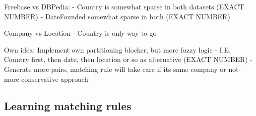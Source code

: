 Freebase vs DBPedia:
- Country is somewhat sparse in both datasets (EXACT NUMBER)
- DateFounded somewhat sparse in both (EXACT NUMBER)

Company vs Location
- Country is only way to go

Own idea: Implement own partitioning blocker, but more fuzzy logic
- I.E. Country first, then date, then location or so as alternative (EXACT NUMBER)
- Generate more pairs, matching rule will take care if its same company or not- more conservative approach


\subsection{Learning matching rules}

